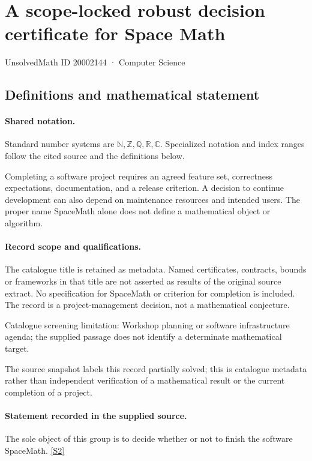 \documentclass[11pt]{article}
\newcommand{\sref}[2]{\hyperlink{source:#1:#2}{[S#2]}}
\begin{document}
\setcounter{section}{20002143}
\section{A scope-locked robust decision certificate for Space Math}\label{20002144}
{\small\sffamily UnsolvedMath ID 20002144 · Computer Science}
\subsection{Definitions and mathematical statement}

\paragraph{Shared notation.}Standard number systems are $\mathbb N,\mathbb Z,\mathbb Q,\mathbb R,\mathbb C$. Specialized notation and index ranges follow the cited source and the definitions below.


Completing a software project requires an agreed feature set, correctness expectations, documentation, and a release criterion. A decision to continue development can also depend on maintenance resources and intended users. The proper name SpaceMath alone does not define a mathematical object or algorithm.
\paragraph{Record scope and qualifications.}
The catalogue title is retained as metadata. Named certificates, contracts, bounds or frameworks in that title are not asserted as results of the original source extract.
No specification for SpaceMath or criterion for completion is included. The record is a project-management decision, not a mathematical conjecture.

Catalogue screening limitation: Workshop planning or software infrastructure agenda; the supplied passage does not identify a determinate mathematical target.

The source snapshot labels this record partially solved; this is catalogue metadata rather than independent verification of a mathematical result or the current completion of a project.
\paragraph{Statement recorded in the supplied source.}
The sole object of this group is to decide whether or not to finish the software SpaceMath. \sref{20002144}{2}
\end{document}
